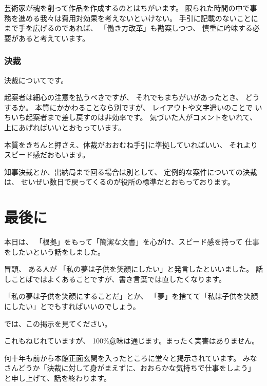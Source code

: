 \documentclass[uplatex,jis2004,dvipdfmx,12pt]{jsarticle}
\begin{document}
芸術家が魂を削って作品を作成するのとはちがいます。
限られた時間の中で事務を進める我々は費用対効果を考えないといけない。
手引に記載のないことにまで手を広げるのであれば、
「働き方改革」も勘案しつつ、
慎重に吟味する必要があると考えています。




\subsubsection{決裁}

決裁についてです。

起案者は細心の注意を払うべきですが、
それでもまちがいがあったとき、
どうするか。
本質にかかわることなら別ですが、
レイアウトや文字遣いのことで
いちいち起案者まで差し戻すのは非効率です。
気づいた人がコメントをいれて、
上にあげればいいとおもっています。

本質をきちんと押さえ、体裁がおおむね手引に準拠していればいい、
それよりスピード感だおもいます。


知事決裁とか、出納局まで回る場合は別として、
定例的な案件についての決裁は、
せいぜい数日で戻ってくるのが役所の標準だとおもっております。



\section{最後に}
本日は、
「根拠」をもって「簡潔な文書」を心がけ、スピード感を持って
仕事をしたいという話をしました。

冒頭、
ある人が
「私の夢は子供を笑顔にしたい」と発言したといいました。
話しことばではよくあることですが、書き言葉では直したくなります。

「私の夢は子供を笑顔にすることだ」とか、
「夢」を捨てて「私は子供を笑顔にしたい」とでもすればいいのでしょう。

では、この掲示を見てください。

これもねじれていますが、
100\%意味は通じます。まったく実害はありません。


何十年も前から本館正面玄関を入ったところに堂々と掲示されています。
みなさんどうか「決裁に対して身がまえずに、おおらかな気持ちで仕事をしよう」
と申し上げて、話を終わります。
\end{document}
